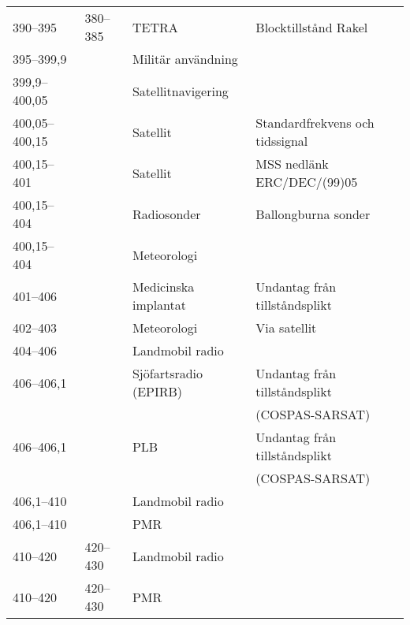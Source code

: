 \begin{landscape}
\begin{longtable}{llll}
	390--395           & 380--385           & TETRA                   & Blocktillstånd Rakel                  \\
	395--399,9         &                    & Militär användning      &                                       \\
	399,9--400,05      &                    & Satellitnavigering      &                                       \\
	400,05--400,15     &                    & Satellit                & Standardfrekvens och tidssignal       \\
	400,15--401        &                    & Satellit                & MSS nedlänk ERC/DEC/(99)05            \\
	400,15--404        &                    & Radiosonder             & Ballongburna sonder                   \\
	400,15--404        &                    & Meteorologi             &                                       \\
	401--406           &                    & Medicinska implantat    & Undantag från tillståndsplikt         \\
	402--403           &                    & Meteorologi             & Via satellit                          \\
	404--406           &                    & Landmobil radio         &                                       \\
	406--406,1         &                    & Sjöfartsradio (EPIRB)   & Undantag från tillståndsplikt         \\
	                   &                    &                         & (COSPAS-SARSAT)                       \\
	406--406,1         &                    & PLB                     & Undantag från tillståndsplikt         \\
	                   &                    &                         & (COSPAS-SARSAT)                       \\
	406,1--410         &                    & Landmobil radio         &                                       \\
	406,1--410         &                    & PMR                     &                                       \\
	410--420           & 420--430           & Landmobil radio         &                                       \\
	410--420           & 420--430           & PMR                     &                                       \\

\end{longtable}
\end{landscape}

